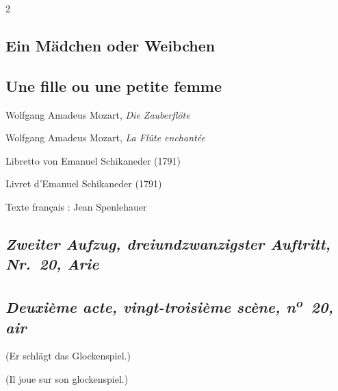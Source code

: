 \documentclass[a4paper,12pt]{article}
\newcommand\chunks[2]{%
\begin{leftcolumn*}\begin{otherlanguage}{german}%
{#1}%
\end{otherlanguage}\end{leftcolumn*}%
\begin{rightcolumn}\begin{otherlanguage}{french}%
{#2}%
\end{otherlanguage}\end{rightcolumn}%
}
\newcommand\strophe[1]{\subsection*{\normalsize\normalfont\itshape #1}}
\begin{document}
\thispagestyle{empty}
\setlength{\columnsep}{8mm}


\begin{paracol}{2}

  \chunks{\section*{Ein Mädchen oder Weibchen}}
         {\section*{Une fille ou une petite femme}}

  \chunks{\noindent\raggedright\small Wolfgang Amadeus Mozart, \textit{Die Zauberflöte}}
         {\noindent\raggedright\small Wolfgang Amadeus Mozart, \textit{La Flûte enchantée}}

  \chunks{\noindent\raggedright\small Libretto von Emanuel Schikaneder (1791)}
         {\noindent\raggedright\small Livret d’Emanuel Schikaneder (1791)}

  \chunks{}
         {\noindent\raggedright\small Texte français : Jean Spenlehauer}

  \chunks{\strophe{Zweiter Aufzug, dreiundzwanzigster Auftritt, Nr.~20, Arie}}
         {\strophe{Deuxième acte, vingt-troisième scène, n\textsuperscript{o}~20, air}}

  \chunks{\noindent\small(Er schlägt das Glockenspiel.)}
         {\noindent\small(Il joue sur son glockenspiel.)}


\end{paracol}
\end{document}
